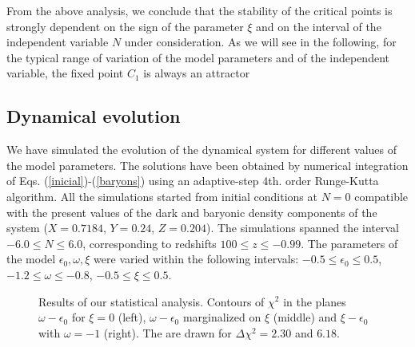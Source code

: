 \documentclass[twocolumn,preprintnumbers,amsmath,amssymb]{revtex4}
\begin{document}
From the above analysis, we conclude that the stability of the critical
points is strongly dependent on the sign of the parameter $\xi$ and
on the interval of the independent variable $N$ under consideration.
As we will see in the following, for the typical range of variation
of the model parameters and of the independent variable, the fixed
point $C_{1}$ is always an attractor


\subsection{Dynamical evolution}

We have simulated the evolution of the dynamical system for different values
of the model parameters. The solutions have been obtained by numerical
integration of Eqs. (\ref{inicial})-(\ref{baryons}) using an adaptive-step 4th. 
order Runge-Kutta algorithm. All the simulations started
from initial conditions at $N=0$ compatible with the present values
of the dark and baryonic density components of the system ($X=0.7184$,
$Y=0.24$, $Z=0.204$). The simulations spanned the interval $-6.0\leq N\leq 6.0$,
corresponding to redshifts $100\leq z\leq -0.99$.
The parameters of the model $\epsilon_{0},\omega,\xi$ were varied
within the following intervals: $-0.5\leq\epsilon_{0}\leq0.5$, $-1.2\leq\omega\leq-0.8$,
$-0.5\leq\xi\leq0.5$. 

\begin{figure*}
\centerline{
}
\caption{Results of our statistical analysis. Contours of $\chi^2$ in the planes $\omega - \epsilon_0$ for $\xi = 0$ (left), $\omega - \epsilon_0$ marginalized on $\xi$ (middle) and $\xi - \epsilon_0$ with $\omega = -1$ (right). 
The are drawn for $\Delta \chi^2 = 2.30$ and $6.18$.}
\label{fig:qzw}
\end{figure*}
\end{document}
